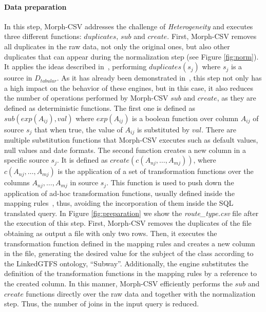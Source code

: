 \paragraph{Data preparation}
In this step, Morph-CSV addresses the challenge of \textit{Heterogeneity} and executes three different functions: $duplicates$, $sub$ and $create$. First, Morph-CSV removes all duplicates in the raw data, not only the original ones, but also other duplicates that can appear during the normalization step (see Figure \ref{fig:norm}). It applies the ideas described in~\citep{jozashoori2019mapsdi}, performing $duplicates(s_{j})$ where $s_{j}$ is a source in $D_{tabular}$. As it has already been demonstrated in~\citep{jozashoori2019mapsdi}, this step not only has a high impact on the behavior of these engines, but in this case, it also reduces the number of operations performed by Morph-CSV $sub$ and $create$, as they are defined as deterministic functions. The first one is defined as $sub(exp(A_{ij}),val)$ where $exp(A_{ij})$ is a boolean function over column $A_{ij}$ of source $s_{j}$ that when true, the value of $A_{ij}$ is substituted by $val$. There are multiple substitution functions that Morph-CSV executes such as default values, null values and date formats. The second function creates a new column in a specific source $s_{j}$. It is defined as $create(c(A_{nj},\ldots,A_{mj}))$, where $c(A_{nj},\ldots,A_{mj})$ is the application of a set of transformation functions over the columns $A_{nj},\ldots,A_{mj}$ in source $s_{j}$. This function is used to push down the application of ad-hoc transformation functions, usually defined inside the mapping rules~\citep{junior2016funul,de2017declarative}, thus, avoiding the incorporation of them inside the SQL translated query. In Figure \ref{fig:preparation} we show the \textit{route\_type.csv} file after the execution of this step. First, Morph-CSV removes the duplicates of the file obtaining as output a file with only two rows. Then, it executes the transformation function defined in the mapping rules and creates a new column in the file, generating the desired value for the subject of the class according to the LinkedGTFS ontology, ``Subway''. Additionally, the engine substitutes the definition of the transformation functions in the mapping rules by a reference to the created column. In this manner, Morph-CSV efficiently performs the $sub$ and $create$ functions directly over the raw data and together with the normalization step. Thus, the number of joins in the input query is reduced.

